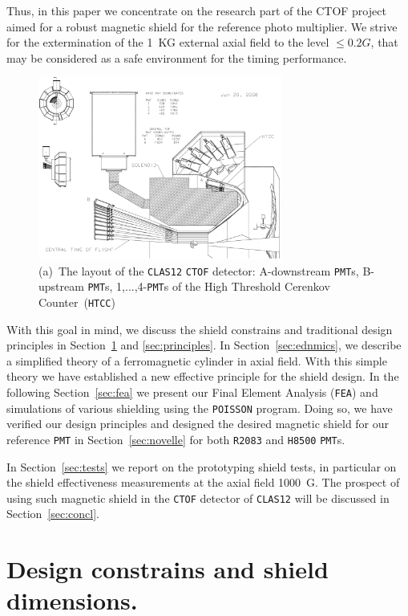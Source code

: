 \documentclass[12pt]{article}
\begin{document}
Thus, in this paper  we concentrate on the research part of the 
CTOF project aimed for a  robust magnetic shield for the reference photo multiplier. 
We strive  for the  extermination of  the  1~KG external axial  field to 
the level  $\le0.2 G$, that may be considered as a safe environment  
for the timing performance.   
%
\begin{figure}[htbp]
\centering
\includegraphics[height=6cm,clip=true,bb= 465 150 2100 1360]{HTCC_CTOF_STUDY_060507_WRAP.eps}
\caption{\small{(a)~The layout of the {\tt CLAS12} {\tt CTOF} detector:
A-downstream {\tt PMT}s, B-upstream {\tt PMT}s, 1,...,4-{\tt PMT}s 
of the High Threshold Cerenkov Counter~({\tt HTCC})}}
\label{barrel2}
\end{figure}
%
With this  goal in mind, we discuss the shield 
constrains and traditional  design principles in Section~\ref{sec:constr} and \ref{sec:principles}.  
In Section~\ref{sec:ednmics},  we describe a simplified  theory 
of a ferromagnetic cylinder in axial field. With this
simple theory  we have  established a 
new effective  principle for the  shield design. 
In the following Section~\ref{sec:fea} we present our 
Final Element Analysis ({\tt FEA}) and  simulations
of various shielding using the  {\tt POISSON} program.
Doing so, we have  verified our design principles and  
designed the desired magnetic shield for our reference {\tt PMT}  in Section~\ref{sec:novelle} 
for both {\tt R2083} and {\tt H8500} {\tt PMT}s.

In Section~\ref{sec:tests} we report on the prototyping shield tests, in particular on 
the shield effectiveness measurements at the axial field  1000~G.
The prospect of using such magnetic shield in the {\tt CTOF} detector 
of {\tt CLAS12} will be discussed in Section~\ref{sec:concl}.   

\section{Design constrains and shield dimensions.}
\label{sec:constr}
\end{document}
